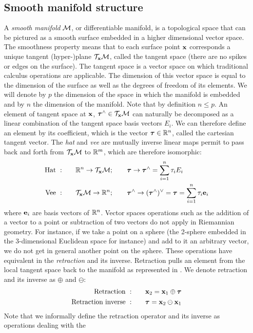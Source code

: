 \subsection{Smooth manifold structure}
A \textit{smooth manifold} $\mathcal{M}$, or differentiable manifold, is a topological space that can be pictured as a smooth surface embedded in a higher dimensional vector space.
The smoothness property means that to each surface point ${\bf x}$ corresponds a unique tangent \mbox{(hyper-)plane} $\mathcal{T}_{{\bf x}}\mathcal{M}$, called the tangent space 
(there are no spikes or edges on the surface). The tangent space is a vector space on which traditional calculus operations are applicable. The dimension of this 
vector space is equal to the dimension of the surface as well as the degrees of freedom of its elements.
We will denote by $p$ the dimension of the space in which the manifold is embedded and by $n$ the dimension of the manifold.
Note that by definition $n \leq p$.  
An element of tangent space at ${\bf x}$, ${\bm \tau}^\wedge \in \mathcal{T}_{{\bf x}}\mathcal{M}$ can naturally be decomposed as a linear combination 
of the tangent space basis vectors $E_i$. We can therefore define an element by its coefficient, which is the vector ${\bm \tau} \in \mathbb{R}^n$, called the cartesian tangent vector.
The \textit{hat} and \textit{vee} are mutually inverse linear maps permit to pass back and forth from $\mathcal{T}_{{\bf x}}\mathcal{M}$ to $\mathbb{R}^m$, which are therefore isomorphic:
%
\begin{align}
    \text{Hat} ~ :& \quad\quad \mathbb{R}^n \rightarrow \mathcal{T}_{{\bf x}}\mathcal{M}; \quad\quad {\bm \tau} \rightarrow {\bm \tau}^\wedge = \sum_{i=1}^n\tau_i E_i  \\
    \text{Vee} ~ :& \quad\quad \mathcal{T}_{{\bf x}}\mathcal{M} \rightarrow \mathbb{R}^n; \quad\quad {\bm \tau}^\wedge \rightarrow ({\bm \tau}^\wedge)^\vee = {\bm \tau} = \sum_{i=1}^n\tau_i {\bf e}_i
\end{align}
where ${\bf e}_i$ are basis vectors of $\mathbb{R}^n$.
%
Vector spaces operations such as the addition of a vector to a point or subtraction of two vectors do not apply in Riemannian geometry. For instance, if we
take a point on a sphere (the 2-sphere embedded in the 3-dimensional Euclidean space for instance) and add to it an arbitrary vector, we do not get in general
another point on the sphere. These operations have equivalent in the \textit{retraction} and its inverse.
Retraction pulls an element from the local tangent space back to the manifold as represented in . We denote retraction and its inverse as 
$\oplus$ and $\ominus$:
%
\begin{align}
            \text{Retraction}~:&\quad\quad {\bf x}_2 = {\bf x}_1 \oplus {\bm \tau}   \\
    \text{Retraction inverse}~:&\quad\quad {\bm \tau} = {\bf x}_2 \ominus {\bf x}_1  \\
\end{align}
%
Note that we informally define the retraction operator and its inverse as operations dealing with the 

